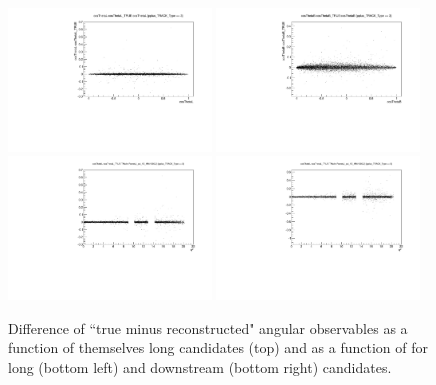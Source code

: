 \begin{figure}
\centering
\includegraphics[width=0.48\textwidth]{Lmumu/figs/resolution/RmT_vs_cosThetaL_LL.pdf}
\includegraphics[width=0.48\textwidth]{Lmumu/figs/resolution/RmT_vs_cosThetaB_LL.pdf}
\includegraphics[width=0.48\textwidth]{Lmumu/figs/resolution/RmTcosThetaL_vs_q2_LL.pdf}
\includegraphics[width=0.48\textwidth]{Lmumu/figs/resolution/RmTcosThetaL_vs_q2_DD.pdf}
 \caption{Difference of ``true minus reconstructed" angular observables as a function of themselves
 long candidates (top) and as a function of \qsq for long (bottom left) and downstream (bottom right)
 candidates.}

\label{fig:resolutionvsq2ang}
\end{figure}

